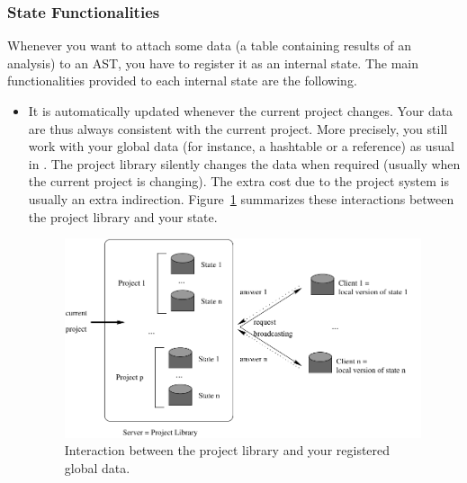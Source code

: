 \subsubsection{State Functionalities}

Whenever you want to attach some data (\eg a table containing results of
an analysis) to an AST, you have to register it as an internal
state. The main functionalities provided to each internal state are the
following.
\begin{itemize}
\item It is automatically updated whenever the current project
  changes. Your data are thus always
  consistent with the current project. More precisely, you
  still work with your global data (for instance, a hashtable or a reference) as
  usual in \ocaml. The project library silently changes the data when required
  (usually when the current project is changing). The extra cost due to the
  project system is usually an extra
  indirection. Figure~\ref{fig:proj-mechanism} summarizes these interactions
  between the project library and your state.
  \begin{figure}[htbp]
    \centering
    \includegraphics[viewport=0 0 440 246,width=0.99\textwidth]{mecanism.pdf}
    \caption{Interaction between the project library and your registered global
      data.}\label{fig:proj-mechanism}
  \end{figure}


\end{itemize}
